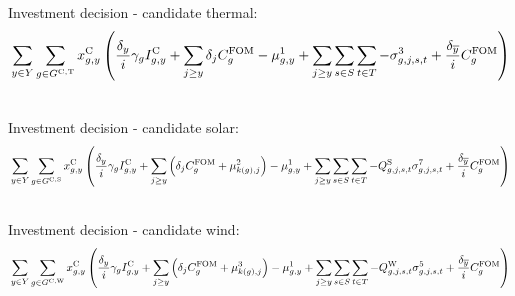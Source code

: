 \documentclass{article}
\begin{document}
Investment decision - candidate thermal:
\begin{align}
	& \sum\limits_{\iYear \in \sYears} \sum\limits_{\iGenerator \in \sGeneratorsCandidateThermal} \vInstalledCapacity \left(\frac{\cDiscountRate}{\cInterestRate} \cAmortisationRate \cCandidateInvestmentCost + \sum\limits_{\iYearAlias \geq \iYear} \cDiscountRate[\iYearAlias] \cFixedOperationsMaintenanceCostGenerator - \dNonNegativeCandidateCapacity + \sum\limits_{\iYearAlias \geq \iYear} \sum\limits_{\iScenario \in \sScenarios} \sum\limits_{\iInterval \in \sIntervals} - \dMaxPowerOutputCandidateThermal[\iGenerator,\iYearAlias,\iScenario,\iInterval] + \frac{\cDiscountRate[\iYearTerminal]}{\cInterestRate}\cFixedOperationsMaintenanceCostGenerator\right)\\\nonumber
\end{align}

Investment decision - candidate solar:
\begin{align}
& \sum\limits_{\iYear \in \sYears} \sum\limits_{\iGenerator \in \sGeneratorsCandidateSolar} \vInstalledCapacity \left(\frac{\cDiscountRate}{\cInterestRate} \cAmortisationRate \cCandidateInvestmentCost + \sum\limits_{\iYearAlias \geq \iYear} \left(\cDiscountRate[\iYearAlias] \cFixedOperationsMaintenanceCostGenerator + \dSolarBuildLimit[k(\iGenerator), \iYearAlias] \right) - \dNonNegativeCandidateCapacity 
+ \sum\limits_{\iYearAlias \geq \iYear} \sum\limits_{\iScenario \in \sScenarios} \sum\limits_{\iInterval \in \sIntervals} - \cCapacityFactorSolar[\iGenerator,\iYearAlias,\iScenario,\iInterval] \dMaxPowerOutputSolarCandidate[\iGenerator,\iYearAlias,\iScenario,\iInterval] + \frac{\cDiscountRate[\iYearTerminal]}{\cInterestRate}\cFixedOperationsMaintenanceCostGenerator\right)\\\nonumber
\end{align}

Investment decision - candidate wind:
\begin{align}
& \sum\limits_{\iYear \in \sYears} \sum\limits_{\iGenerator \in \sGeneratorsCandidateWind} \vInstalledCapacity \left(\frac{\cDiscountRate}{\cInterestRate} \cAmortisationRate \cCandidateInvestmentCost + \sum\limits_{\iYearAlias \geq \iYear} \left(\cDiscountRate[\iYearAlias] \cFixedOperationsMaintenanceCostGenerator + \dWindBuildLimit[k(\iGenerator), \iYearAlias] \right) - \dNonNegativeCandidateCapacity 
+ \sum\limits_{\iYearAlias \geq \iYear} \sum\limits_{\iScenario \in \sScenarios} \sum\limits_{\iInterval \in \sIntervals} - \cCapacityFactorWind[\iGenerator,\iYearAlias,\iScenario,\iInterval] \dMaxPowerOutputWindCandidate[\iGenerator,\iYearAlias,\iScenario,\iInterval] + \frac{\cDiscountRate[\iYearTerminal]}{\cInterestRate}\cFixedOperationsMaintenanceCostGenerator \right)\\\nonumber
\end{align}
\end{document}
